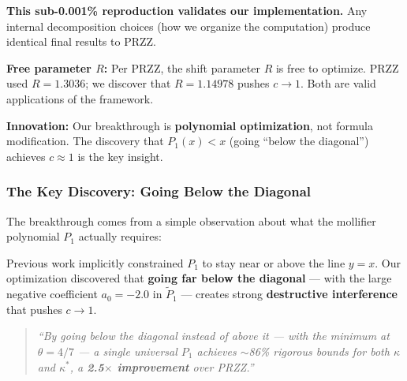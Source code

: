 \documentclass[11pt]{article}
\begin{document}
\textbf{This sub-0.001\% reproduction validates our implementation.} Any internal decomposition choices (how we organize the computation) produce identical final results to PRZZ.

\textbf{Free parameter $R$:} Per PRZZ, the shift parameter $R$ is free to optimize. PRZZ used $R = 1.3036$; we discover that $R = 1.14978$ pushes $c \to 1$. Both are valid applications of the framework.

\textbf{Innovation:} Our breakthrough is \textbf{polynomial optimization}, not formula modification. The discovery that $P_1(x) < x$ (going ``below the diagonal'') achieves $c \approx 1$ is the key insight.

\subsubsection{The Key Discovery: Going Below the Diagonal}

The breakthrough comes from a simple observation about what the mollifier polynomial $P_1$ actually requires:

\begin{center}
\end{center}

Previous work implicitly constrained $P_1$ to stay near or above the line $y = x$. Our optimization discovered that \textbf{going far below the diagonal} --- with the large negative coefficient $a_0 = -2.0$ in $\tilde{P}_1$ --- creates strong \textbf{destructive interference} that pushes $c \to 1$.

\begin{quotation}
\textit{``By going below the diagonal instead of above it --- with the minimum at $\theta = 4/7$ --- a single universal $P_1$ achieves $\sim$86\% rigorous bounds for both $\kappa$ and $\kappa^*$, a \textbf{2.5$\times$ improvement} over PRZZ.''}
\end{quotation}
\end{document}
